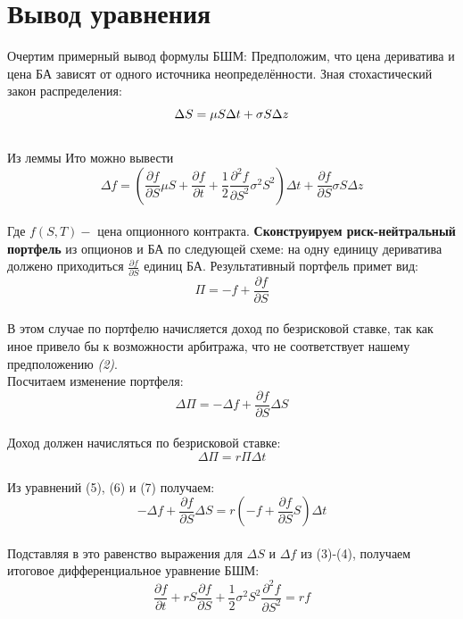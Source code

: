 \documentclass{article}
\begin{document}
\section{Вывод уравнения}
Очертим примерный вывод формулы БШМ:
Предположим, что цена дериватива и цена БА зависят от одного источника неопределённости. Зная стохастический закон распределения:
\begin{equation}
\Delta S=\mu S \Delta t+\sigma S \Delta z \\
\end{equation}\\
Из леммы Ито можно вывести
\begin{equation}
\Delta f=\left(\frac{\partial f}{\partial S} \mu S+\frac{\partial f}{\partial t}+\frac{1}{2} \frac{\partial^2 f}{\partial S^2} \sigma^2 S^2\right) \Delta t+\frac{\partial f}{\partial S} \sigma S \Delta z
\end{equation}\\
Где $f(S,T) -$ цена опционного контракта.
\textbf{Сконструируем риск-нейтральный портфель} из опционов и БА по следующей схеме: на одну единицу дериватива должено приходиться $\frac{\partial f}{\partial S}$ единиц БА. Результативный портфель примет вид:
\begin{equation}
    \Pi = -f+\frac{\partial f}{\partial S}
\end{equation}\\
В этом случае по портфелю начисляется доход по безрисковой ставке, так как иное привело бы к возможности арбитража, что не соответствует нашему предположению \textit{(2)}.\\
Посчитаем изменение портфеля:
\begin{equation}
    \Delta \Pi = -\Delta f+\frac{\partial f}{\partial S} \Delta S
\end{equation}\\
Доход должен начисляться по безрисковой ставке:
\begin{equation}
    \Delta \Pi = r\Pi \Delta t
\end{equation}\\
Из уравнений (5), (6) и (7) получаем:
\begin{equation*}
    -\Delta f+\frac{\partial f}{\partial S} \Delta S = r\left(-f +\frac{\partial f}{\partial S}S\right) \Delta t
\end{equation*}\\
Подставляя в это равенство выражения для $\Delta S$ и $\Delta f$ из (3)-(4), получаем итоговое дифференциальное уравнение БШМ:
\begin{equation}
    \frac{\partial f}{\partial t}+rS\frac{\partial f}{\partial S}+\frac{1}{2}\sigma^2S^2\frac{\partial^2 f}{\partial S^2}=rf
\end{equation}
\end{document}
